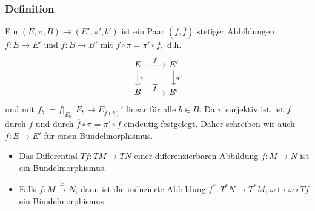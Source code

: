 \subsubsection[Definition: Bündelmorphismus]{Definition} %
\label{ssub:432}
Ein  $(E,\pi , B) \to (E', \pi', b')$  ist ein Paar $(f, \overline{f})$ stetiger Abbildungen $f : E \to E'$ und $\overline{f} : B \to B'$ mit
\(
	\overline{f} \circ \pi  = \pi' \circ f, 
\)
d.h. 
\[
	\begin{tikzcd}
		E \rar{f} \dar{\pi }& E' \dar{\pi'}\\
		B \rar{\overline{f}}& B'
	\end{tikzcd}
\]
und mit  $f_b := f\big|_{E_b} : E_{b} \to E_{\overline{f}(b) }'$ linear für alle $b \in B$.
Da $\pi $ surjektiv ist, ist $\overline{f}$ durch $f$ und durch $\overline{f} \circ \pi = \pi' \circ f $ eindeutig festgelegt. Daher schreiben wir auch $f : E \to E'$ für
einen Bündelmorphismus.
\begin{itemize}
	\item Das Differential $T f : TM \to TN$ einer differenzierbaren Abbildung $f : M \to N$ ist ein Bündelmorphismus.
	\item Falls $f : M \xrightarrow{\cong} N$, dann ist die induzierte Abbildung $f^* : T^*N \to T^* M$, $\omega \mapsto \omega \circ Tf$ ein Bündelmorphismus.
\end{itemize}

